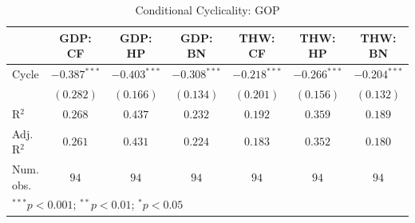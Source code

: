 
\usepackage{booktabs}

\begin{table}
\begin{center}
\begin{tabular}{l c c c c c c}
\toprule
 & GDP: CF & GDP: HP & GDP: BN & THW: CF & THW: HP & THW: BN \\
\midrule
Cycle      & $-0.387^{***}$ & $-0.403^{***}$ & $-0.308^{***}$ & $-0.218^{***}$ & $-0.266^{***}$ & $-0.204^{***}$ \\
           & $(0.282)$      & $(0.166)$      & $(0.134)$      & $(0.201)$      & $(0.156)$      & $(0.132)$      \\
\midrule
R$^2$      & $0.268$        & $0.437$        & $0.232$        & $0.192$        & $0.359$        & $0.189$        \\
Adj. R$^2$ & $0.261$        & $0.431$        & $0.224$        & $0.183$        & $0.352$        & $0.180$        \\
Num. obs.  & $94$           & $94$           & $94$           & $94$           & $94$           & $94$           \\
\bottomrule
\multicolumn{7}{l}{\scriptsize{$^{***}p<0.001$; $^{**}p<0.01$; $^{*}p<0.05$}}
\end{tabular}
\caption{Conditional Cyclicality: GOP}
\label{tab:gop_cycle}
\end{center}
\end{table}
